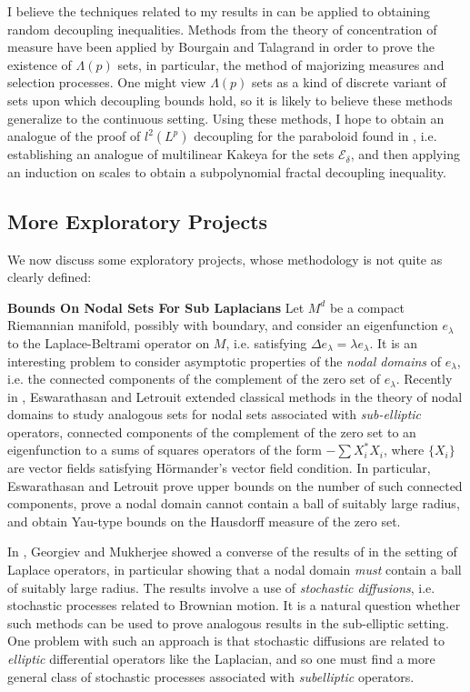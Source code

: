 \documentclass[11pt]{article}
\begin{document}
I believe the techniques related to my results in \cite{DensonFourier} can be applied to obtaining random decoupling inequalities. Methods from the theory of concentration of measure have been applied by Bourgain \cite{Bourgain} and Talagrand \cite{Talagrand} in order to prove the existence of $\Lambda(p)$ sets, in particular, the method of majorizing measures and selection processes. One might view $\Lambda(p)$ sets as a kind of discrete variant of sets upon which decoupling bounds hold, so it is likely to believe these methods generalize to the continuous setting. Using these methods, I hope to obtain an analogue of the proof of $l^2(L^p)$ decoupling for the paraboloid found in \cite{BourgainDemeterStudyGuide}, i.e. establishing an analogue of multilinear Kakeya for the sets $\mathcal{E}_\delta$, and then applying an induction on scales to obtain a subpolynomial fractal decoupling inequality.

\subsection{More Exploratory Projects}

We now discuss some exploratory projects, whose methodology is not quite as clearly defined:\vspace{0.3em}

{\bf Bounds On Nodal Sets For Sub Laplacians} Let $M^d$ be a compact Riemannian manifold, possibly with boundary, and consider an eigenfunction $e_\lambda$ to the Laplace-Beltrami operator on $M$, i.e. satisfying $\Delta e_\lambda = \lambda e_\lambda$. It is an interesting problem to consider asymptotic properties of the \emph{nodal domains} of $e_\lambda$, i.e. the connected components of the complement of the zero set of $e_\lambda$. Recently in \cite{EswarathasanLetrouit}, Eswarathasan and Letrouit extended classical methods in the theory of nodal domains to study analogous sets for nodal sets associated with \emph{sub-elliptic} operators, connected components of the complement of the zero set to an eigenfunction to a sums of squares operators of the form $- \sum X_i^* X_i$, where $\{ X_i \}$ are vector fields satisfying H\"{o}rmander's vector field condition. In particular, Eswarathasan and Letrouit prove upper bounds on the number of such connected components, prove a nodal domain cannot contain a ball of suitably large radius, and obtain Yau-type bounds on the Hausdorff measure of the zero set.

In \cite{GeorgievMukherjee}, Georgiev and Mukherjee showed a converse of the results of \cite{EswarathasanLetrouit} in the setting of Laplace operators, in particular showing that a nodal domain \emph{must} contain a ball of suitably large radius. The results involve a use of \emph{stochastic diffusions}, i.e. stochastic processes related to Brownian motion. It is a natural question whether such methods can be used to prove analogous results in the sub-elliptic setting. One problem with such an approach is that stochastic diffusions are related to \emph{elliptic} differential operators like the Laplacian, and so one must find a more general class of stochastic processes associated with \emph{subelliptic} operators.
\end{document}
